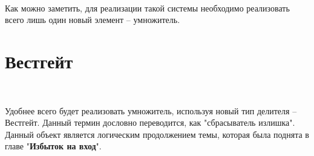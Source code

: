 \

Как можно заметить, для реализации такой системы необходимо реализовать всего лишь один новый элемент -- умножитель. 

































\vspace{1in}

\section{Вестгейт}

\

Удобнее всего будет реализовать умножитель, используя новый тип делителя -- Вестгейт. Данный термин дословно переводится, как "сбрасыватель излишка". Данный объект является логическим продолжением темы, которая была поднята в главе "\textbf{Избыток на вход}". 








\vspace{0.5in}

